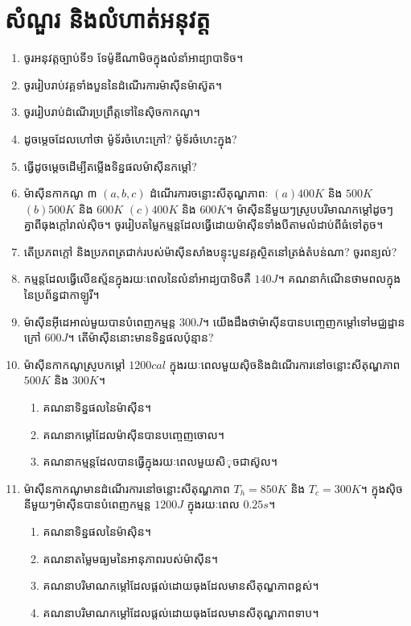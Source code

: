 \section{សំណួរ និងលំហាត់អនុវត្ត}
\begin{enumerate}
	\item ចូរអនុវត្តច្បាប់ទី១ ទែម៉ូឌីណាមិចក្នុងលំនាំអាដ្យាបាទិច។
	\item ចូររៀបរាប់វគ្គទាំងបួននៃដំណើរការម៉ាសុីនម៉ាស៊ូត។
	\item ចូររៀបរាប់ដំណើរប្រព្រឹត្តទៅនៃសុិចកាកណូ។
	\item ដូចម្តេចដែលហៅថា ម៉ូទ័រចំហេះក្រៅ? ម៉ូទ័រចំហេះក្នុង?
	\item ធ្វើដូចម្តេចដើម្បីតម្លើងទិន្នផលម៉ាសុីនកម្តៅ?
	\item ម៉ាសុីនកាកណូ ៣ $\left(a,b,c\right)$ ដំណើរការចន្លោះសីតុណ្ហភាពៈ $(a) 400K$ និង $500K$ $\left(b\right) 500K$ និង $600K$ $\left(c\right) 400K$ និង $600K$។ ម៉ាសុីននីមួយៗស្រូបបរិមាណកម្តៅដូចៗគ្នាពីធុងក្តៅរាល់សុិច។ ចូររៀបតម្លៃកម្មន្តដែលធ្វើដោយម៉ាសុីនទាំងបីតាមលំដាប់ពីធំទៅតូច។
	\item តើប្រភពក្តៅ និងប្រភពត្រជាក់របស់ម៉ាសុីនសាំងបន្ទុះបួនវគ្គស្ថិតនៅត្រង់តំបន់ណា? ចូរពន្យល់?
	\item កម្មន្តដែលធ្វើលើឧស្ម័នក្នុងរយៈពេលនៃលំនាំអាដ្យបាទិចគឺ $140J$។ គណនាកំណើនថាមពលក្នុងនៃប្រព័ន្ធជាកាឡូរី។
	\item ម៉ាសុីនអុីដេអាល់មួយបានបំពេញកម្មន្ត $300J$។ យើងដឹងថាម៉ាសុីនបានបញ្ចេញកម្តៅទៅមជ្ឈដ្ឋានក្រៅ $600J$។ តើម៉ាសុីននោះមានទិន្នផលប៉ុន្មាន?
	\item ម៉ាសុីនកាកណូស្រូបកម្តៅ $1200cal$ ក្នុងរយៈពេលមួយសុិចនិងដំណើរការនៅចន្លោះសីតុណ្ហភាព $500K$ និង $300K$។
	\begin{enumerate}
		\item គណនាទិន្នផលនៃម៉ាសុីន។
		\item គណនាកម្តៅដែលម៉ាសុីនបានបញ្ចេញចោល។
		\item គណនាកម្មន្តដែលបានធ្វើក្នុងរយៈពេលមួយសិុចជាស៊ូល។
	\end{enumerate}
	\item ម៉ាសុីនកាកណូមានដំណើរការនៅចន្លោះសីតុណ្ហភាព $T_{h}=850K$ និង $T_{c}=300K$។ ក្នុងសុិចនីមួយៗម៉ាសុីនបានបំពេញកម្មន្ត $1200J$ ក្នុងរយៈពេល $0.25s$។
	\begin{enumerate}
		\item គណនាទិន្នផលនៃម៉ាសុិន។
		\item គណនាតម្លៃមធ្យមនៃអានុភាពរបស់ម៉ាសុីន។
		\item គណនាបរិមាណកម្តៅដែលផ្តល់ដោយធុងដែលមានសីតុណ្ហភាពខ្ពស់។
		\item គណនាបរិមាណកម្តៅដែលផ្តល់ដោយធុងដែលមានសីតុណ្ហភាពទាប។

\end{enumerate}
\end{enumerate}
